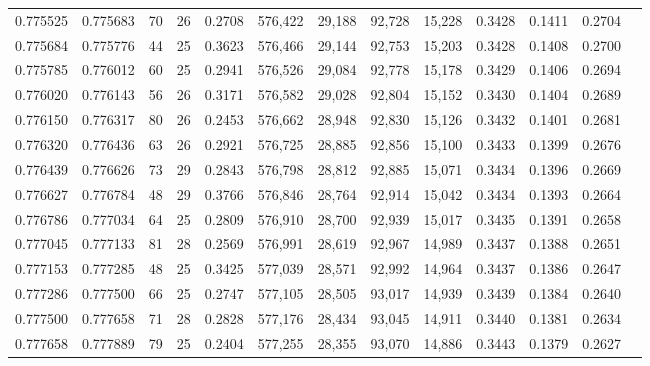 \begin{tabular}{rrrrrrrrrrrrr}
0.775525 & 0.775683 &    70 &  26 &                                     0.2708 & 576,422 &  29,188 &  92,728 &  15,228 & 0.3428 & 0.1411 & 0.2704 \\
0.775684 & 0.775776 &    44 &  25 &                                     0.3623 & 576,466 &  29,144 &  92,753 &  15,203 & 0.3428 & 0.1408 & 0.2700 \\
0.775785 & 0.776012 &    60 &  25 &                                     0.2941 & 576,526 &  29,084 &  92,778 &  15,178 & 0.3429 & 0.1406 & 0.2694 \\
0.776020 & 0.776143 &    56 &  26 &                                     0.3171 & 576,582 &  29,028 &  92,804 &  15,152 & 0.3430 & 0.1404 & 0.2689 \\
0.776150 & 0.776317 &    80 &  26 &                                     0.2453 & 576,662 &  28,948 &  92,830 &  15,126 & 0.3432 & 0.1401 & 0.2681 \\
0.776320 & 0.776436 &    63 &  26 &                                     0.2921 & 576,725 &  28,885 &  92,856 &  15,100 & 0.3433 & 0.1399 & 0.2676 \\
0.776439 & 0.776626 &    73 &  29 &                                     0.2843 & 576,798 &  28,812 &  92,885 &  15,071 & 0.3434 & 0.1396 & 0.2669 \\
0.776627 & 0.776784 &    48 &  29 &                                     0.3766 & 576,846 &  28,764 &  92,914 &  15,042 & 0.3434 & 0.1393 & 0.2664 \\
0.776786 & 0.777034 &    64 &  25 &                                     0.2809 & 576,910 &  28,700 &  92,939 &  15,017 & 0.3435 & 0.1391 & 0.2658 \\
0.777045 & 0.777133 &    81 &  28 &                                     0.2569 & 576,991 &  28,619 &  92,967 &  14,989 & 0.3437 & 0.1388 & 0.2651 \\
0.777153 & 0.777285 &    48 &  25 &                                     0.3425 & 577,039 &  28,571 &  92,992 &  14,964 & 0.3437 & 0.1386 & 0.2647 \\
0.777286 & 0.777500 &    66 &  25 &                                     0.2747 & 577,105 &  28,505 &  93,017 &  14,939 & 0.3439 & 0.1384 & 0.2640 \\
0.777500 & 0.777658 &    71 &  28 &                                     0.2828 & 577,176 &  28,434 &  93,045 &  14,911 & 0.3440 & 0.1381 & 0.2634 \\
0.777658 & 0.777889 &    79 &  25 &                                     0.2404 & 577,255 &  28,355 &  93,070 &  14,886 & 0.3443 & 0.1379 & 0.2627 \\

\end{tabular}
